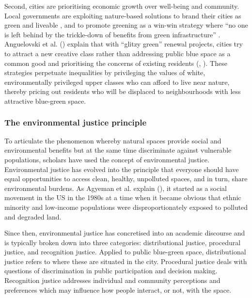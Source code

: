 \documentclass{article}
\begin{document}
Second, cities are prioritising economic growth over well-being and community. Local governments are exploiting nature-based solutions to brand their cities as green and liveable
, and to promote greening as a win-win strategy where ``no one is left behind by the trickle-down of benefits from green infrastructure'' \parencite{anguelovski2021green}.
Anguelovski et al. (\citeyear{anguelovski2021green}) explain that with ``glitzy green'' renewal projects, cities try to attract a new creative class rather than addressing public blue space as a common good and prioritising the concerns of existing residents (\cite{wessells2014urban}, \cite{anguelovski2020expanding}).
These strategies perpetuate inequalities by privileging the values of white, environmentally privileged upper classes who can afford to live near nature, thereby pricing out residents who will be displaced to neighbourhoods with less attractive blue-green space.

\subsubsection{The environmental justice principle}

To articulate the phenomenon whereby natural spaces provide social and environmental benefits but at the same time discriminate against vulnerable populations, scholars have used the concept of environmental justice.
Environmental justice has evolved into the principle that everyone should have equal opportunities to access clean, healthy, unpolluted spaces, and in turn, share environmental burdens. As Agyeman et al. explain (\citeyear{agyeman2016trends}), it started as a social movement in the US in the 1980s at a time when it became obvious that ethnic minority and low-income populations were disproportionately exposed to polluted and degraded land.

Since then, environmental justice has concretised into an academic discourse and is typically broken down into three categories: distributional justice, procedural justice, and recognition justice.
Applied to public blue-green space, distributional justice refers to where these are situated in the city.
Procedural justice deals with questions of discrimination in public participation and decision making. 
Recognition justice addresses individual and community perceptions and preferences which may influence how people interact, or not, with the space.
\end{document}
